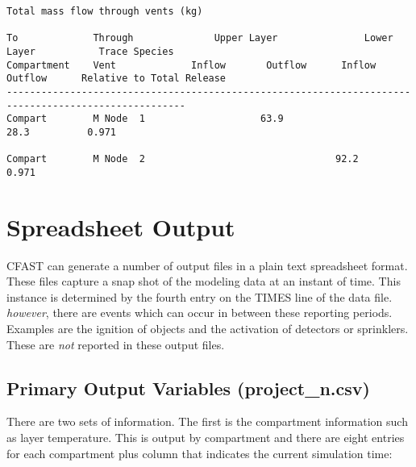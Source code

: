 \begin{lstlisting}[basicstyle=\tiny]
Total mass flow through vents (kg)

To             Through              Upper Layer               Lower Layer           Trace Species
Compartment    Vent             Inflow       Outflow      Inflow       Outflow      Relative to Total Release
-----------------------------------------------------------------------------------------------------
Compart        M Node  1                    63.9                      28.3          0.971

Compart        M Node  2                                 92.2                       0.971
\end{lstlisting}



\section{Spreadsheet Output}

CFAST can generate a number of output files in a plain text spreadsheet format.  These files capture a snap shot of the modeling data at an instant of time. This instance is determined by the fourth entry on the TIMES line of the data file. \emph{however}, there are events which can occur in between these reporting periods. Examples are the ignition of objects and the activation of detectors or sprinklers. These are \emph{not} reported in these output files.

\subsection{Primary Output Variables (project\_n.csv)}

There are two sets of information. The first is the compartment information such as layer temperature. This is output by compartment and there are eight entries for each compartment plus column that indicates the current simulation time:

